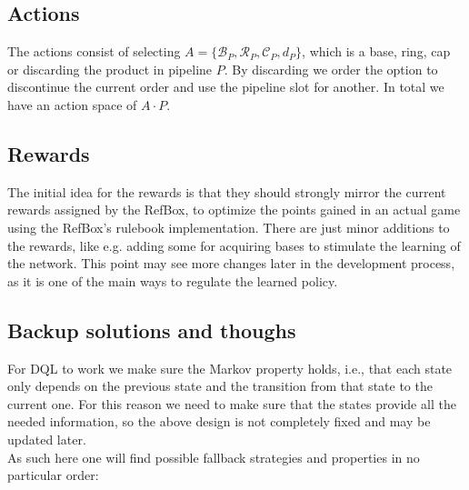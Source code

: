 \documentclass[runningheads,envcountsect]{llncs}
\begin{document}
\subsection{Actions}
The actions consist of selecting $A=\{\mathcal{B}_P, \mathcal{R}_P, \mathcal{C}_P, d_P\}$, which is a base, ring, cap or discarding the product in pipeline $P$. By discarding we order the option to discontinue the current order and use the pipeline slot for another. In total we have an action space of $A\cdot P$.


\subsection{Rewards}
The initial idea for the rewards is that they should strongly mirror the current rewards assigned by the RefBox, to optimize the points gained in an actual game using the RefBox's rulebook implementation. There are just minor additions to the rewards, like e.g. adding some for acquiring bases to stimulate the learning of the network. This point may see more changes later in the development process, as it is one of the main ways to regulate the learned policy.


\subsection{Backup solutions and thoughs} \label{risks}
For DQL to work we make sure the Markov property holds, i.e., that each state only depends on the previous state and the transition from that state to the current one. For this reason we need to make sure that the states provide all the needed information, so the above design is not completely fixed and may be updated later.\\
As such here one will find possible fallback strategies and properties in no particular order:
\end{document}

